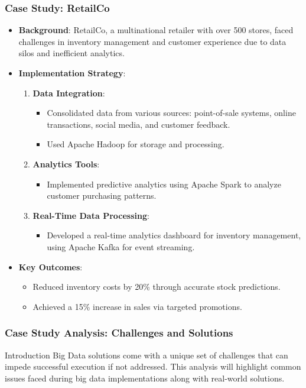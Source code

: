 \documentclass[aspectratio=169]{beamer}
\begin{document}
\begin{frame}[fragile]
    \frametitle{Case Study: RetailCo}
    \begin{itemize}
        \item \textbf{Background}: RetailCo, a multinational retailer with over 500 stores, faced challenges in inventory management and customer experience due to data silos and inefficient analytics.
        
        \item \textbf{Implementation Strategy}:
        \begin{enumerate}
            \item \textbf{Data Integration}:
            \begin{itemize}
                \item Consolidated data from various sources: point-of-sale systems, online transactions, social media, and customer feedback.
                \item Used Apache Hadoop for storage and processing.
            \end{itemize}
            \item \textbf{Analytics Tools}:
            \begin{itemize}
                \item Implemented predictive analytics using Apache Spark to analyze customer purchasing patterns.
            \end{itemize}
            \item \textbf{Real-Time Data Processing}:
            \begin{itemize}
                \item Developed a real-time analytics dashboard for inventory management, using Apache Kafka for event streaming.
            \end{itemize}
        \end{enumerate}

        \item \textbf{Key Outcomes}:
        \begin{itemize}
            \item Reduced inventory costs by 20\% through accurate stock predictions.
            \item Achieved a 15\% increase in sales via targeted promotions.
        \end{itemize}
    \end{itemize}
\end{frame}

\begin{frame}[fragile]
    \frametitle{Case Study Analysis: Challenges and Solutions}
    \begin{block}{Introduction}
        Big Data solutions come with a unique set of challenges that can impede successful execution if not addressed. 
        This analysis will highlight common issues faced during big data implementations along with real-world solutions.
    \end{block}
\end{frame}
\end{document}
